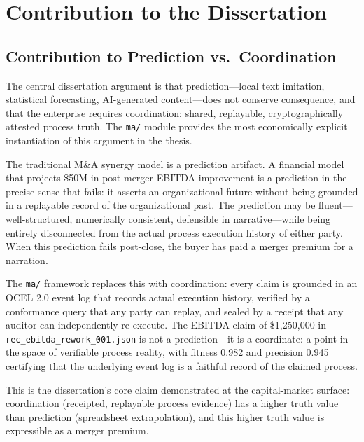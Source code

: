 
\section{Contribution to the Dissertation}
\label{sec:ma-contribution}

\subsection{Contribution to Prediction vs.~Coordination}
\label{sec:ma-contrib-prediction}

The central dissertation argument is that prediction---local text imitation, statistical
forecasting, AI-generated content---does not conserve consequence, and that the enterprise
requires coordination: shared, replayable, cryptographically attested process truth. The
\texttt{ma/} module provides the most economically explicit instantiation of this argument
in the thesis.

The traditional M\&A synergy model is a prediction artifact. A financial model that projects
\$50M in post-merger EBITDA improvement is a prediction in the precise sense that fails: it
asserts an organizational future without being grounded in a replayable record of the
organizational past. The prediction may be fluent---well-structured, numerically consistent,
defensible in narrative---while being entirely disconnected from the actual process execution
history of either party. When this prediction fails post-close, the buyer has paid a merger
premium for a narration.

The \texttt{ma/} framework replaces this with coordination: every claim is grounded in an
OCEL 2.0 event log that records actual execution history, verified by a conformance query
that any party can replay, and sealed by a receipt that any auditor can independently
re-execute. The EBITDA claim of \$1,250,000 in \texttt{rec\_ebitda\_rework\_001.json} is not
a prediction---it is a coordinate: a point in the space of verifiable process reality, with
fitness 0.982 and precision 0.945 certifying that the underlying event log is a faithful
record of the claimed process.

This is the dissertation's core claim demonstrated at the capital-market surface: coordination
(receipted, replayable process evidence) has a higher truth value than prediction (spreadsheet
extrapolation), and this higher truth value is expressible as a merger premium.

